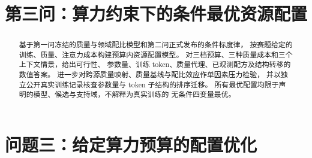 \documentclass[bwprint,withoutpreface]{gmcmthesis}
\title{第三问：算力约束下的条件最优资源配置}
\begin{document}
\maketitle
\begin{abstract}
基于第一问冻结的质量与领域配比模型和第二问正式发布的条件标度律，
按赛题给定的训练、质量、注意力成本构建预算内资源配置模型。
对三档预算、三种质量成本和三个上下文情景，给出可行性、
参数量、训练 token、质量代理、已观测配方及结构转移的数值答案。
进一步对跨源质量映射、质量基线与配比效应作单因素压力检验，
并以独立公开真实训练记录核查参数量与 token 子结构的排序迁移。
所有最优配置均限于声明的模型、候选与支持域，不解释为真实训练的
无条件四变量最优。
\end{abstract}
\maketoc
\clearpage

\section{问题三：给定算力预算的配置优化}



\end{document}
